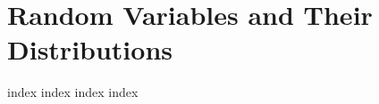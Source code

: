 \chapter{Random Variables and Their Distributions}
\label{ch:cp}
\ifdefined\HCode
\else
{
\startcontents[chapter]
}
\fi

{index}
{index}
{index}
{index}

\ifdefined\HCode
{}
\fi

\ifdefined\HCode
\else
{
\stopcontents[chapter]
}
\fi

\ifdefined\HCode
{}
\fi